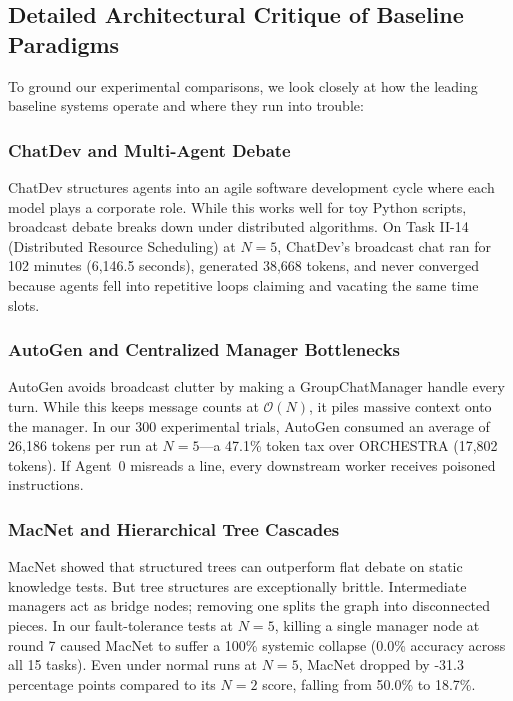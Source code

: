 \documentclass{ieeeaccess}
\begin{document}
\subsection{Detailed Architectural Critique of Baseline Paradigms}
To ground our experimental comparisons, we look closely at how the leading baseline systems operate and where they run into trouble:

\subsubsection{ChatDev and Multi-Agent Debate}
ChatDev \cite{qian2024chatdev} structures agents into an agile software development cycle where each model plays a corporate role. While this works well for toy Python scripts, broadcast debate breaks down under distributed algorithms. On Task II-14 (Distributed Resource Scheduling) at $N=5$, ChatDev's broadcast chat ran for 102 minutes (6,146.5 seconds), generated 38,668 tokens, and never converged because agents fell into repetitive loops claiming and vacating the same time slots.

\subsubsection{AutoGen and Centralized Manager Bottlenecks}
AutoGen \cite{wu2024autogen} avoids broadcast clutter by making a GroupChatManager handle every turn. While this keeps message counts at $\mathcal{O}(N)$, it piles massive context onto the manager. In our 300 experimental trials, AutoGen consumed an average of 26,186 tokens per run at $N=5$---a 47.1\% token tax over ORCHESTRA (17,802 tokens). If Agent~0 misreads a line, every downstream worker receives poisoned instructions.

\subsubsection{MacNet and Hierarchical Tree Cascades}
MacNet \cite{wang2025macnet} showed that structured trees can outperform flat debate on static knowledge tests. But tree structures are exceptionally brittle. Intermediate managers act as bridge nodes; removing one splits the graph into disconnected pieces. In our fault-tolerance tests at $N=5$, killing a single manager node at round 7 caused MacNet to suffer a 100\% systemic collapse (0.0\% accuracy across all 15 tasks). Even under normal runs at $N=5$, MacNet dropped by -31.3 percentage points compared to its $N=2$ score, falling from 50.0\% to 18.7\%.
\end{document}
